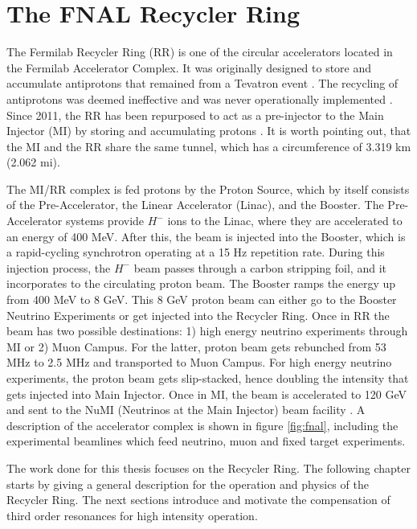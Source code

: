\chapter{The FNAL Recycler Ring}
\label{sec:ch2}

The Fermilab Recycler Ring (RR) is one of the circular accelerators located in the Fermilab Accelerator Complex. It was originally designed to store and accumulate antiprotons that remained from a Tevatron event \cite{rr0}. The recycling of antiprotons was deemed ineffective and was never operationally implemented \cite{rrnagaitsev}. Since 2011, the RR has been repurposed to act as a pre-injector to the Main Injector (MI) by storing and accumulating protons \cite{rr1}. It is worth pointing out, that the MI and the RR share the same tunnel, which has a circumference of 3.319 km (2.062 mi).

The MI/RR complex is fed protons by the Proton Source, which by itself consists of the Pre-Accelerator, the Linear Accelerator (Linac), and the Booster. The Pre-Accelerator systems provide $H^-$ ions to the Linac, where they are accelerated to an energy of 400 MeV. After this, the beam is injected into the Booster, which is a rapid-cycling synchrotron operating at a 15 Hz repetition rate. During this injection process, the $H^-$ beam passes through a carbon stripping foil, and it incorporates to the circulating proton beam. The Booster ramps the energy up from 400 MeV to 8 GeV. This 8 GeV proton beam can either go to the Booster Neutrino Experiments or get injected into the Recycler Ring. Once in RR the beam has two possible destinations: 1) high energy neutrino experiments through MI or 2) Muon Campus. For the latter, proton beam gets rebunched from 53 MHz to 2.5 MHz and transported to Muon Campus. For high energy neutrino experiments, the proton beam gets slip-stacked, hence doubling the intensity that gets injected into Main Injector. Once in MI, the beam is accelerated to 120 GeV and sent to the NuMI (Neutrinos at the Main Injector) beam facility \cite{rr1, rrnagaitsev, numi1}. A description of the accelerator complex is shown in figure \ref{fig:fnal}, including the experimental beamlines which feed neutrino, muon and fixed target experiments.

The work done for this thesis focuses on the Recycler Ring. The following chapter starts by giving a general description for the operation and physics of the Recycler Ring. The next sections introduce and motivate the compensation of third order resonances for high intensity operation.\\     

